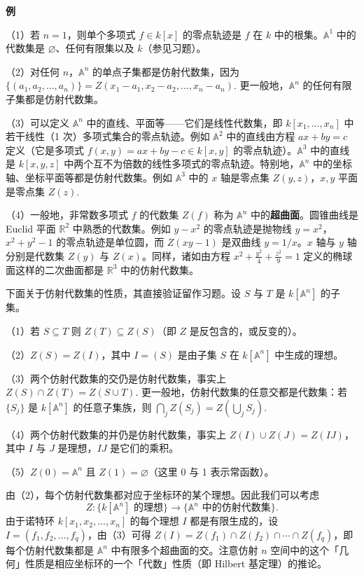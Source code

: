 \noindent\textbf{例}

（1）若 \(n = 1\)，则单个多项式 \(f \in k[x]\) 的零点轨迹是 \(f\) 在 \(k\) 中的根集。\(\mathbb{A}^1\) 中的代数集是 \(\varnothing\)、任何有限集以及 \(k\)（参见习题）。

（2）对任何 \(n\)，\(\mathbb{A}^n\) 的单点子集都是仿射代数集，因为 \(\{(a_1, a_2, \ldots, a_n)\} = Z(x_1-a_1, x_2-a_2, \ldots, x_n-a_n)\). 更一般地，\(\mathbb{A}^n\) 的任何有限子集都是仿射代数集。

（3）可以定义 \(\mathbb{A}^n\) 中的直线、平面等——它们是线性代数集，即 \(k[x_1, \ldots, x_n]\) 中若干线性（1 次）多项式集合的零点轨迹。例如 \(\mathbb{A}^2\) 中的直线由方程 \(ax+by = c\) 定义（它是多项式 \(f(x,y) = ax+by-c \in k[x,y]\) 的零点轨迹）。\(\mathbb{A}^3\) 中的直线是 \(k[x,y,z]\) 中两个互不为倍数的线性多项式的零点轨迹。特别地，\(\mathbb{A}^n\) 中的坐标轴、坐标平面等都是仿射代数集。例如 \(\mathbb{A}^3\) 中的 \(x\) 轴是零点集 \(Z(y,z)\)，\(x,y\) 平面是零点集 \(Z(z)\).

（4）一般地，非常数多项式 \(f\) 的代数集 \(Z(f)\) 称为 \(\mathbb{A}^n\) 中的\textbf{超曲面}。圆锥曲线是 Euclid 平面 \(\mathbb{R}^2\) 中熟悉的代数集。例如 \(y-x^2\) 的零点轨迹是抛物线 \(y = x^2\)，\(x^2+y^2-1\) 的零点轨迹是单位圆，而 \(Z(xy-1)\) 是双曲线 \(y = 1/x\)。\(x\) 轴与 \(y\) 轴分别是代数集 \(Z(y)\) 与 \(Z(x)\)。同样，诸如由方程 \(x^2+\frac{y^2}{4}+\frac{z^2}{9} = 1\) 定义的椭球面这样的二次曲面都是 \(\mathbb{R}^3\) 中的仿射代数集。

下面关于仿射代数集的性质，其直接验证留作习题。设 \(S\) 与 \(T\) 是 \(k[\mathbb{A}^n]\) 的子集。

（1）若 \(S \subseteq T\) 则 \(Z(T) \subseteq Z(S)\)（即 \(Z\) 是反包含的，或反变的）。

（2）\(Z(S) = Z(I)\)，其中 \(I = (S)\) 是由子集 \(S\) 在 \(k[\mathbb{A}^n]\) 中生成的理想。

（3）两个仿射代数集的交仍是仿射代数集，事实上 \(Z(S) \cap Z(T) = Z(S \cup T)\). 更一般地，仿射代数集的任意交都是代数集：若 \(\{S_j\}\) 是 \(k[\mathbb{A}^n]\) 的任意子集族，则 \(\bigcap_j Z(S_j) = Z(\bigcup_j S_j)\).

（4）两个仿射代数集的并仍是仿射代数集，事实上 \(Z(I) \cup Z(J) = Z(IJ)\)，其中 \(I\) 与 \(J\) 是理想，\(IJ\) 是它们的乘积。

（5）\(Z(0) = \mathbb{A}^n\) 且 \(Z(1) = \varnothing\)（这里 0 与 1 表示常函数）。

由（2），每个仿射代数集都对应于坐标环的某个理想。因此我们可以考虑
\[
Z : \{k[\mathbb{A}^n] \text{ 的理想}\} \to \{\mathbb{A}^n \text{ 中的仿射代数集}\}.
\]
由于诺特环 \(k[x_1, x_2, \ldots, x_n]\) 的每个理想 \(I\) 都是有限生成的，设 \(I = (f_1, f_2, \ldots, f_q)\)，由（3）可得 \(Z(I) = Z(f_1) \cap Z(f_2) \cap \cdots \cap Z(f_q)\)，即每个仿射代数集都是 \(\mathbb{A}^n\) 中有限多个超曲面的交。注意仿射 \(n\) 空间中的这个「几何」性质是相应坐标环的一个「代数」性质（即 Hilbert 基定理）的推论。

